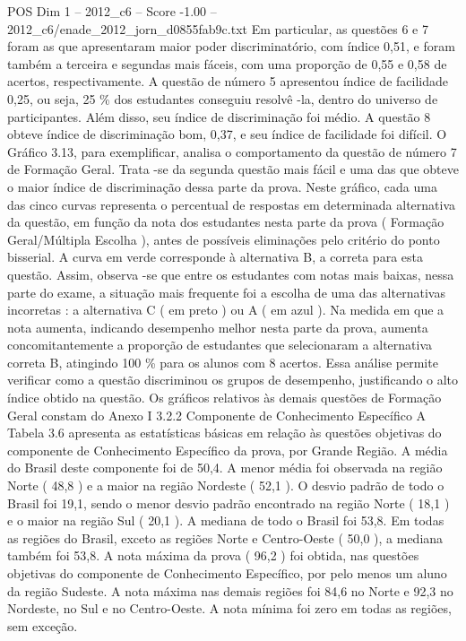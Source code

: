 \begin{textsample}{POS Dim 1 – 2012\_c6 – Score -1.00 – 2012\_c6/enade\_2012\_jorn\_d0855fab9c.txt}
Em particular, as questões 6 e 7 foram as que apresentaram maior poder discriminatório, com índice 0,51, e foram também a terceira e segundas mais fáceis, com uma proporção de 0,55 e 0,58 de acertos, respectivamente.
A questão de número 5 apresentou índice de facilidade 0,25, ou seja, 25 \% dos estudantes conseguiu resolvê -la, dentro do universo de participantes.
Além disso, seu índice de discriminação foi médio.
A questão 8 obteve índice de discriminação bom, 0,37, e seu índice de facilidade foi difícil.
O Gráfico 3.13, para exemplificar, analisa o comportamento da questão de número 7 de Formação Geral.
Trata -se da segunda questão mais fácil e uma das que obteve o maior índice de discriminação dessa parte da prova.
Neste gráfico, cada uma das cinco curvas representa o percentual de respostas em determinada alternativa da questão, em função da nota dos estudantes nesta parte da prova ( Formação Geral/Múltipla Escolha ), antes de possíveis eliminações pelo critério do ponto bisserial.
A curva em verde corresponde à alternativa B, a correta para esta questão.
Assim, observa -se que entre os estudantes com notas mais baixas, nessa parte do exame, a situação mais frequente foi a escolha de uma das alternativas incorretas : a alternativa C ( em preto ) ou A ( em azul ).
Na medida em que a nota aumenta, indicando desempenho melhor nesta parte da prova, aumenta concomitantemente a proporção de estudantes que selecionaram a alternativa correta B, atingindo 100 \% para os alunos com 8 acertos.
Essa análise permite verificar como a questão discriminou os grupos de desempenho, justificando o alto índice obtido na questão.
Os gráficos relativos às demais questões de Formação Geral constam do Anexo I 3.2.2 Componente de Conhecimento Específico A Tabela 3.6 apresenta as estatísticas básicas em relação às questões objetivas do componente de Conhecimento Específico da prova, por Grande Região.
A média do Brasil deste componente foi de 50,4.
A menor média foi observada na região Norte ( 48,8 ) e a maior na região Nordeste ( 52,1 ).
O desvio padrão de todo o Brasil foi 19,1, sendo o menor desvio padrão encontrado na região Norte ( 18,1 ) e o maior na região Sul ( 20,1 ).
A mediana de todo o Brasil foi 53,8.
Em todas as regiões do Brasil, exceto as regiões Norte e Centro-Oeste ( 50,0 ), a mediana também foi 53,8.
A nota máxima da prova ( 96,2 ) foi obtida, nas questões objetivas do componente de Conhecimento Específico, por pelo menos um aluno da região Sudeste.
A nota máxima nas demais regiões foi 84,6 no Norte e 92,3 no Nordeste, no Sul e no Centro-Oeste.
A nota mínima foi zero em todas as regiões, sem exceção.

\end{textsample}
